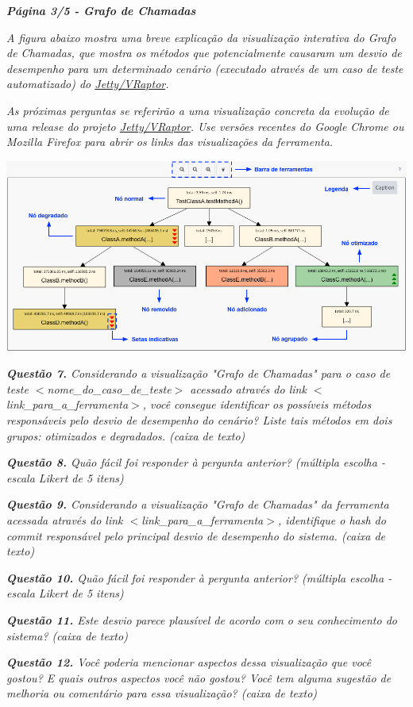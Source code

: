 \begin{framed}
	\noindent \textit{\textbf{Página 3/5 - Grafo de Chamadas}}
	\par
	\noindent \textit{A figura abaixo mostra uma breve explicação da visualização interativa do Grafo de Chamadas, que mostra os métodos que potencialmente causaram um desvio de desempenho para um determinado cenário (executado através de um caso de teste automatizado) do \underline{Jetty/VRaptor}.}

	\noindent \textit{As próximas perguntas se referirão a uma visualização concreta da evolução de uma release do projeto \underline{Jetty/VRaptor}. Use versões recentes do Google Chrome ou Mozilla Firefox para abrir os links das visualizações da ferramenta.}
	
   \includegraphics[scale=0.41]{Imagens/call_graph_explicative_portuguese.png}

	\noindent \textit{\textbf{Questão 7.} Considerando a visualização "Grafo de Chamadas" para o caso de teste {\(<\)}nome\_do\_caso\_de\_teste{\(>\)} acessado através do link {\(<\)}link\_para\_a\_ferramenta{\(>\)}, você consegue identificar os possíveis métodos responsáveis pelo desvio de desempenho do cenário? Liste tais métodos em dois grupos: otimizados e degradados. (caixa de texto)}
	\par
	\noindent \textit{\textbf{Questão 8.} Quão fácil foi responder à pergunta anterior? (múltipla escolha - escala Likert de 5 itens)}
	\par
	\noindent \textit{\textbf{Questão 9.} Considerando a visualização "Grafo de Chamadas" da ferramenta acessada através do link {\(<\)}link\_para\_a\_ferramenta{\(>\)}, identifique o hash do commit responsável pelo principal desvio de desempenho do sistema. (caixa de texto)}
	\par
	\noindent \textit{\textbf{Questão 10.} Quão fácil foi responder à pergunta anterior? (múltipla escolha - escala Likert de 5 itens)}
	\par
	\noindent \textit{\textbf{Questão 11.} Este desvio parece plausível de acordo com o seu conhecimento do sistema? (caixa de texto)}
	\par
	\noindent \textit{\textbf{Questão 12.} Você poderia mencionar aspectos dessa visualização que você gostou? E quais outros aspectos você não gostou? Você tem alguma sugestão de melhoria ou comentário para essa visualização? (caixa de texto)}
\end{framed}


